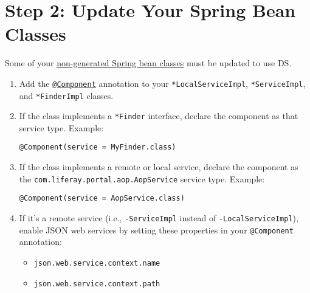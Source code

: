 \section{Step 2: Update Your Spring Bean
Classes}\label{step-2-update-your-spring-bean-classes}

Some of your
\href{/docs/7-2/appdev/-/knowledge_base/a/understanding-the-code-generated-by-service-builder}{non-generated
Spring bean classes} must be updated to use DS.

\begin{enumerate}
\def\labelenumi{\arabic{enumi}.}
\item
  Add the
  \href{https://docs.osgi.org/javadoc/osgi.cmpn/7.0.0/org/osgi/service/component/annotations/Component.html}{\texttt{@Component}}
  annotation to your \texttt{*LocalServiceImpl}, \texttt{*ServiceImpl},
  and \texttt{*FinderImpl} classes.
\item
  If the class implements a \texttt{*Finder} interface, declare the
  component as that service type. Example:

\begin{verbatim}
@Component(service = MyFinder.class)
\end{verbatim}
\item
  If the class implements a remote or local service, declare the
  component as the \texttt{com.liferay.portal.aop.AopService} service
  type. Example:

\begin{verbatim}
@Component(service = AopService.class)
\end{verbatim}
\item
  If it's a remote service (i.e., \texttt{-ServiceImpl} instead of
  \texttt{-LocalServiceImpl}), enable JSON web services by setting these
  properties in your \texttt{@Component} annotation:

  \begin{itemize}
  \tightlist
  \item
    \texttt{json.web.service.context.name}
  \item
    \texttt{json.web.service.context.path}
  \end{itemize}


\end{enumerate}
